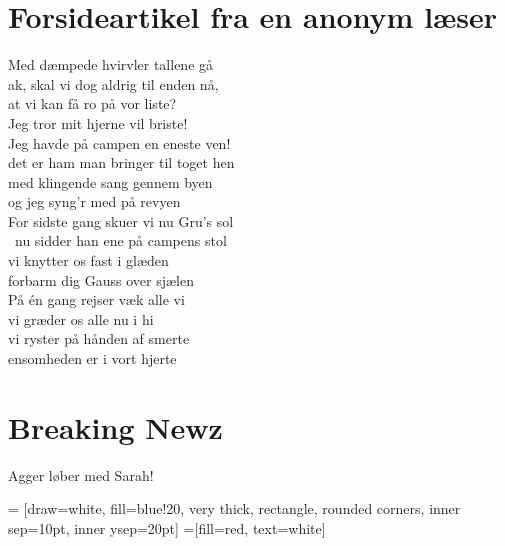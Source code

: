 

\begin{minipage}[b]{0.95\linewidth}
\begin{minipage}[t]{0.47\textwidth}
\vspace{3mm}
\section*{Forsideartikel fra en anonym læser}

Med dæmpede hvirvler tallene gå \\
ak, skal vi dog aldrig til enden nå, \\
at vi kan få ro på vor liste? \\
Jeg tror mit hjerne vil briste! \\
 
Jeg havde på campen en eneste ven! \\
det er ham man bringer til toget hen \\
med klingende sang gennem byen \\
og jeg syng'r med på revyen \\

For sidste gang skuer vi nu Gru's sol \\\
nu sidder han ene på campens stol \\
vi knytter os fast i glæden \\
forbarm dig Gauss over sjælen \\

På én gang rejser væk alle vi \\
vi græder os alle nu i hi \\
vi ryster på hånden af smerte \\
ensomheden er i vort hjerte \\

\section*{\Huge Breaking Newz}
\Huge Agger løber med Sarah!

\end{minipage}
\hfill\begin{minipage}[t]{0.47\textwidth}

\vspace{1mm}
 = [draw=white, fill=blue!20, very thick,
    rectangle, rounded corners, inner sep=10pt, inner ysep=20pt]
\tikzstyle{fancytitle} =[fill=red, text=white]


\end{minipage}
\end{minipage}

